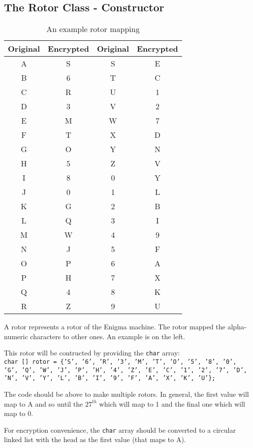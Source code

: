 \documentclass[11pt]{article}
\begin{document}
\subsection{The Rotor Class - Constructor}
\begin{wraptable}{l}{9cm}
  \caption{An example rotor mapping}
\begin{tabular}{c | c | c | c}
  Original & Encrypted & Original & Encrypted \\ \hline
  A  & S &  S  & E \\
  B  & 6 &  T  & C \\
  C  & R &  U  & 1 \\
  D  & 3 &  V  & 2 \\
  E  & M &  W  & 7 \\
  F  & T &  X  & D \\
  G  & O &  Y  & N \\
  H  & 5 &  Z  & V \\
  I  & 8 &  0  & Y \\
  J  & 0 &  1  & L \\
  K  & G &  2  & B \\
  L  & Q &  3  & I \\
  M  & W &  4  & 9 \\
  N  & J &  5  & F \\
  O  & P &  6  & A \\
  P  & H &  7  & X \\
  Q  & 4 &  8  & K \\
  R  & Z &  9  & U \\
\end{tabular}
\end{wraptable}
A rotor represents a rotor of the Enigma machine. The rotor mapped the alpha-numeric characters to other ones. An example is on the left.

This rotor will be contructed by providing the \texttt{char} array:\\
\texttt{char [] rotor = \{'S', '6', 'R', '3', 'M', 'T', 'O', '5', '8', '0', 'G', 'Q', 'W', 'J', 'P',
  'H', '4', 'Z', 'E', 'C', '1', '2', '7', 'D', 'N', 'V', 'Y', 'L', 'B', 
  'I', '9', 'F', 'A', 'X', 'K', 'U'\};
}

The code should be above to make multiple rotors. In general, the first value will map to A and so until
the $27^{th}$ which will map to 1 and the final one which will map to 0. 

For encryption convenience, the \texttt{char} array
should be converted to a circular linked list with the head as the first value (that maps to A).
\end{document}
